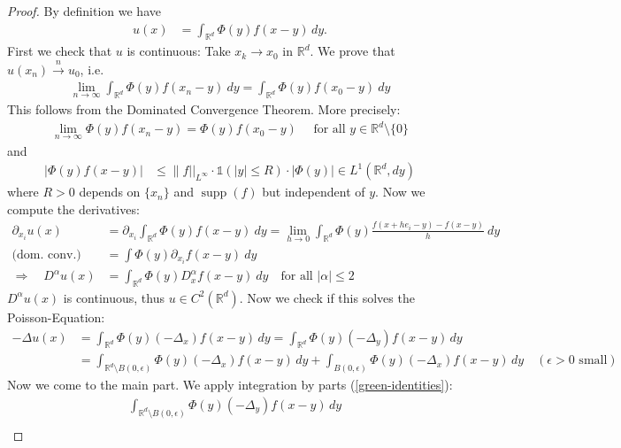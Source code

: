 \documentclass{report}
\theoremstyle{tommy}
\begin{document}
\begin{proof}
  By definition we have
  \begin{align*}
    u(x) &= \int_{\mathbb{R}^d} \Phi(y) f(x-y) \, dy.
  \end{align*}
  First we check that \(u\) is continuous: Take \(x_k \to x_0\) in \(\mathbb{R}^d\). We prove that \(u(x_n) \xrightarrow{n} u_0\), i.e.
  \begin{align*}
    \lim_{n \to \infty} \int_{\mathbb{R}^d} \Phi(y) f(x_n - y) \ dy = \int_{\mathbb{R}^d} \Phi(y) f(x_0 - y) \ dy
  \end{align*}
  This follows from the Dominated Convergence Theorem. More precisely:
  \begin{align*}
    \lim_{n \to \infty} \Phi(y) f(x_n -y) = \Phi(y) f(x_0 - y) \quad \text{ for all } y \in \mathbb{R}^d \setminus \{0\}
  \end{align*}
  and 
  \begin{align*}
    |\Phi(y) f(x-y)| &\le \| f ||_{L^\infty} \cdot \mathbb{1}(|y| \le R) \cdot |\Phi(y)| \in L^1(\mathbb{R}^d, dy)
  \end{align*}
  where \(R > 0\) depends on \(\{x_n\}\) and \(\operatorname{supp}(f)\) but independent of \(y\). Now we compute the derivatives:
  \begin{align*}
    \partial_{x_i} u(x) 
    &= \partial_{x_i} \int_{\mathbb{R}^d} \Phi(y) f(x-y) \ dy
    = \lim_{h \to 0} \int_{\mathbb{R}^d} \Phi(y) \frac{f(x + h e_i - y) - f(x-y)}{h} \ dy \\
    \text{(dom.\ conv.)} \quad &= \int \Phi(y) \partial_{x_i} f(x-y) \ dy \\
    \Rightarrow \quad D^\alpha u(x) &= \int_{\mathbb{R}^d} \Phi(y) D_x^\alpha f(x-y) \ dy \quad \text{for all } |\alpha| \le 2
  \end{align*}
  \(D^\alpha u(x)\)  is continuous, thus \(u \in C^2(\mathbb{R}^d)\).
  Now we check if this solves the Poisson-Equation:
  \begin{align*}
    - \Delta u(x) 
    &= \int_{\mathbb{R}^d} \Phi(y) (-\Delta_x) f(x-y) \, dy
    = \int_{\mathbb{R}^d} \Phi(y) (-\Delta_y) f(x-y) \, dy \\
    &= \int_{\mathbb{R}^d \setminus B(0, \epsilon)} \Phi(y) (-\Delta_x) f(x-y) \, dy + \int_{B(0, \epsilon)} \Phi(y) (-\Delta_x) f(x-y) \, dy \quad (\epsilon > 0 \text{ small})
  \end{align*}
  Now we come to the main part. We apply integration by parts (\ref{green-identities}):
  \begin{align*}
    &\int_{\mathbb{R}^d \setminus B(0, \epsilon)} \Phi(y)(- \Delta_y) f(x-y) \, dy \\

\end{align*}
\end{proof}
\end{document}
